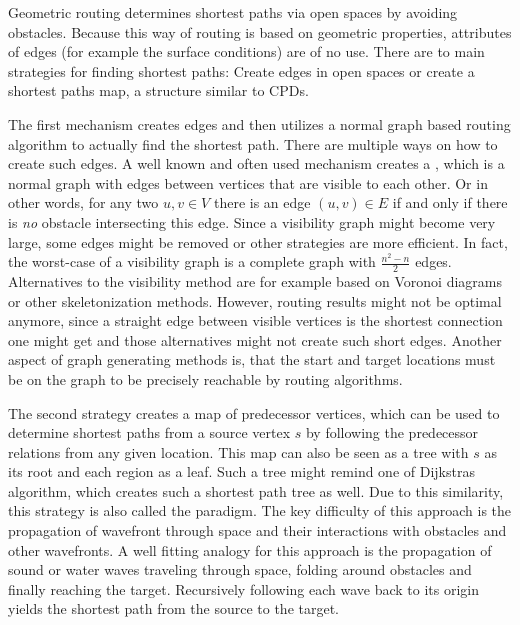 	Geometric routing determines shortest paths via open spaces by avoiding obstacles.
	Because this way of routing is based on geometric properties, attributes of edges (for example the surface conditions) are of no use.
	There are to main strategies for finding shortest paths:
	Create edges in open spaces or create a shortest paths map, a structure similar to CPDs.
	
	The first mechanism creates edges and then utilizes a normal graph based routing algorithm to actually find the shortest path.
	There are multiple ways on how to create such edges.
	A well known and often used mechanism creates a , which is a normal graph with edges between vertices that are visible to each other.
	Or in other words, for any two $u, v \in V$ there is an edge $(u, v) \in E$ if and only if there is \textit{no} obstacle intersecting this edge.
	Since a visibility graph might become very large, some edges might be removed or other strategies are more efficient.
	In fact, the worst-case of a visibility graph is a complete graph with $\frac{n^2 - n}{2}$ edges.
	Alternatives to the visibility method are for example based on Voronoi diagrams or other skeletonization methods\cite[3-4]{graser-osm-open-spaces}.
	However, routing results might not be optimal anymore, since a straight edge between visible vertices is the shortest connection one might get and those alternatives might not create such short edges\cite[7]{graser-osm-open-spaces}.
	Another aspect of graph generating methods is, that the start and target locations must be on the graph to be precisely reachable by routing algorithms.
	
	The second strategy creates a map of predecessor vertices, which can be used to determine shortest paths from a source vertex $s$ by following the predecessor relations from any given location.
	This map can also be seen as a tree with $s$ as its root and each region as a leaf.
	Such a tree might remind one of Dijkstras algorithm, which creates such a shortest path tree as well.
	Due to this similarity, this strategy is also called the  paradigm\cite[648]{mitchell-discrete-geodesic}.
	The key difficulty of this approach is the propagation of wavefront through space and their interactions with obstacles and other wavefronts\cite[3]{hershberger-suri}.
	A well fitting analogy for this approach is the propagation of sound or water waves traveling through space, folding around obstacles and finally reaching the target.
	Recursively following each wave back to its origin yields the shortest path from the source to the target.

